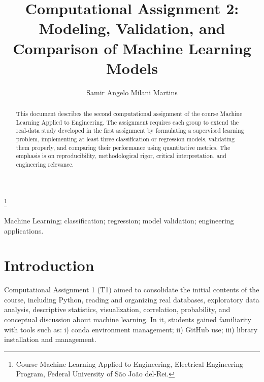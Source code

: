 \documentclass[a4paper]{ifacconf}
\begin{document}

\begin{frontmatter}

\title{Computational Assignment 2: Modeling, Validation, and Comparison of Machine Learning Models}

\thanks[footnoteinfo]{Course Machine Learning Applied to Engineering, Electrical Engineering Program, Federal University of S\~ao Jo\~ao del-Rei.}

\author[First]{Samir Angelo Milani Martins}

\address[First]{Department of Electrical Engineering, Federal University of S\~ao Jo\~ao del-Rei, MG.}

\renewcommand{\abstractname}{{\bf Abstract:~}}
\begin{abstract}
This document describes the second computational assignment of the course Machine Learning Applied to Engineering. The assignment requires each group to extend the real-data study developed in the first assignment by formulating a supervised learning problem, implementing at least three classification or regression models, validating them properly, and comparing their performance using quantitative metrics. The emphasis is on reproducibility, methodological rigor, critical interpretation, and engineering relevance.

\end{abstract}

\begin{keyword}
Machine Learning; classification; regression; model validation; engineering applications.

\end{keyword}

\end{frontmatter}


\section{Introduction}

Computational Assignment 1 (T1) aimed to consolidate the initial contents of the course, including Python, reading and organizing real databases, exploratory data analysis, descriptive statistics, visualization, correlation, probability, and conceptual discussion about machine learning. In it, students gained familiarity with tools such as: i) conda environment management; ii) GitHub use; iii) library installation and management.
\end{document}
